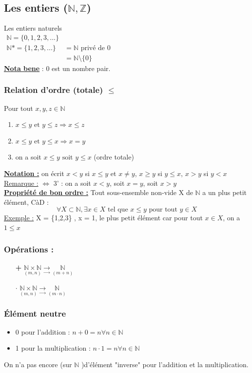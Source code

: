 \documentclass[12pt,a4paper]{article}
\newcommand{\evid}[1]{\textbf{\underline{#1}}}
\newcommand{\N}{\ensuremath{\mathbb{N}} }
\newcommand{\Z}{\ensuremath{\mathbb{Z}} }
\newcommand{\et}{\mbox{ et }}
\begin{document}
\subsection{Les entiers ($\N, \Z$)}
Les entiers naturels \\
$\begin{array}{ll}
\N = \{0, 1, 2, 3,...\}\\
\N* = \{1,2,3,...\} & = \N \mbox{ privé de } 0 \\
&= \N\setminus \{0\}
\end{array}$\\
\evid{Nota bene} : 0 est un nombre pair.

\subsubsection{Relation d'ordre (totale) $\leq$}
Pour tout $x, y, z \in \N$
\begin{enumerate}
\item $x \leq y \et y \leq z \Rightarrow x \leq z$
\item $x \leq y \et y \leq x \Rightarrow x = y$
\item on a soit $x \leq y \mbox{ soit } y \leq x$ (ordre totale)
\end{enumerate}
\evid{Notation :} on écrit $x<y$ si $x \leq y$ et $x \neq y$, $x \geq y$ si $y \leq x$, $x > y$ si $y < x$
\underline{Remarque :} $\Leftrightarrow$ 3' : on a soit $x < y$, soit $x = y$, soit $x > y$\\
\evid{Propriété de bon ordre :} Tout sous-ensemble non-vide X de $\N$ a un plus petit élément, CàD :
\begin{equation}
\forall X \subset \N, \exists x \in X \mbox{ tel que }x \leq y\mbox{ pour tout }y \in X
\end{equation}
\underline{Exemple :} X = \{1,2,3\} , x = 1, le plus petit élément car pour tout $x \in X$, on a $1 \leq x$

\subsubsection{Opérations :}
\begin{itemize}
\item[\textbf{+}] $\underset{(m,n)}{\N \times \N} \underset{\to}{\to} \underset{(m+n)}{\N}$	 
\item[\textbf{$\cdot$}] $\underset{(m,n)}{\N \times \N} \underset{\to}{\to} \underset{(m\cdot n)}{\N}$	 
\end{itemize}
\subsubsection{Élément neutre}
\begin{itemize}
\item 0 pour l'addition : $n+0 = n \forall n \in \N$
\item 1 pour la multiplication : $n \cdot 1 = n \forall n \in \N$
\end{itemize}
On n'a pas encore (sur \N)d'élément "inverse" pour l'addition et la multiplication.
\end{document}
